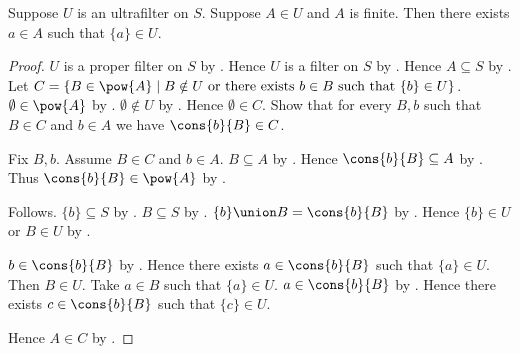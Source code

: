 \begin{theorem}\label{finite_ultrafilter_member_contains_singleton}
    Suppose $U$ is an ultrafilter on $S$.
    Suppose $A\in U$ and $A$ is finite.
    Then there exists $a\in A$ such that $\{a\}\in U$.
\end{theorem}
\begin{proof}
    $U$ is a proper filter on $S$ by .
    Hence $U$ is a filter on $S$ by .
    Hence $A\subseteq S$ by .
    Let $C=\{B\in\pow{A}\mid
        \text{$B\notin U$ or there exists $b\in B$ such that
            $\{b\}\in U$}\}$.
    $\emptyset\in\pow{A}$ by .
    $\emptyset\notin U$ by .
    Hence $\emptyset\in C$.
    Show that for every $B,b$ such that $B\in C$ and $b\in A$ we have
        $\cons{b}{B}\in C$.
    \begin{subproof}
        Fix $B,b$.
        Assume $B\in C$ and $b\in A$.
        $B\subseteq A$ by .
        Hence $\cons{b}{B}\subseteq A$
            by .
        Thus $\cons{b}{B}\in\pow{A}$
            by .
        \begin{byCase}
            Follows.
            $\{b\}\subseteq S$ by
                .
            $B\subseteq S$ by .
            $\{b\}\union B=\cons{b}{B}$
                by .
            Hence $\{b\}\in U$ or $B\in U$
                by .
            \begin{byCase}
                $b\in\cons{b}{B}$ by .
                Hence there exists $a\in\cons{b}{B}$ such that
                    $\{a\}\in U$.
                Then $B\in U$.
                Take $a\in B$ such that $\{a\}\in U$.
                $a\in\cons{b}{B}$ by .
                Hence there exists $c\in\cons{b}{B}$ such that
                    $\{c\}\in U$.
            \end{byCase}
        \end{byCase}
    \end{subproof}
    Hence $A\in C$ by .
\end{proof}


